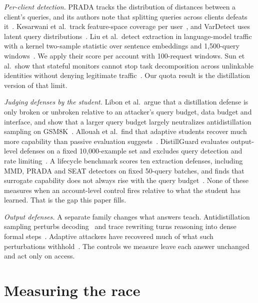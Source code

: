 \documentclass[journal]{IEEEtran}
\begin{document}
\textit{Per-client detection.} PRADA tracks the distribution of distances between a client's queries, and its authors note that splitting queries across clients defeats it~\cite{juuti2019prada}. Kesarwani et al.\ track feature-space coverage per user~\cite{kesarwani2018warning}, and VarDetect uses latent query distributions~\cite{pal2021stateful}. Liu et al.\ detect extraction in language-model traffic with a kernel two-sample statistic over sentence embeddings and 1,500-query windows~\cite{liu2026detector,mmd2026artifact}. We apply their score per account with 100-request windows. Sun et al.\ show that stateful monitors cannot stop task decomposition across unlinkable identities without denying legitimate traffic~\cite{sun2026decomposition}. Our quota result is the distillation version of that limit.

\textit{Judging defenses by the student.} Libon et al.\ argue that a distillation defense is only broken or unbroken relative to an attacker's query budget, data budget and interface, and show that a larger query budget largely neutralizes antidistillation sampling on GSM8K~\cite{libon2026break}. Allouah et al.\ find that adaptive students recover much more capability than passive evaluation suggests~\cite{allouah2026game}. DistillGuard evaluates output-level defenses on a fixed 10,000-example set and excludes query detection and rate limiting~\cite{jiang2026distillguard}. A lifecycle benchmark scores ten extraction defenses, including MMD, PRADA and SEAT detectors on fixed 50-query batches, and finds that surrogate capability does not always rise with the query budget~\cite{liu2026lifecycle}. None of these measures when an account-level control fires relative to what the student has learned. That is the gap this paper fills.

\textit{Output defenses.} A separate family changes what answers teach. Antidistillation sampling perturbs decoding~\cite{savani2025antidistillation} and trace rewriting turns reasoning into dense formal steps~\cite{ma2026tracerewriting}. Adaptive attackers have recovered much of what such perturbations withhold~\cite{libon2026break,allouah2026game,zhu2026learnability}. The controls we measure leave each answer unchanged and act only on access.

\section{Measuring the race}
\label{sec:method}
\end{document}

